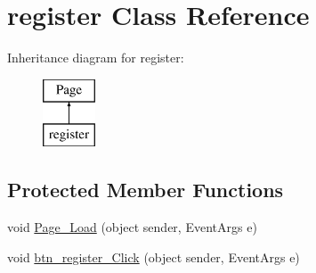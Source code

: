 \hypertarget{classregister}{}\section{register Class Reference}
\label{classregister}
Inheritance diagram for register\+:\begin{figure}[H]
\begin{center}
\leavevmode
\includegraphics[height=2.000000cm]{classregister}
\end{center}
\end{figure}
\subsection*{Protected Member Functions}
\begin{DoxyCompactItemize}
\item 
void \mbox{\hyperlink{classregister_ad970a9929fba7b42ad397e0340ee0e1c}{Page\+\_\+\+Load}} (object sender, Event\+Args e)
\item 
void \mbox{\hyperlink{classregister_a71861250310b5e264704ebe1b848dc2e}{btn\+\_\+register\+\_\+\+Click}} (object sender, Event\+Args e)
\end{DoxyCompactItemize}
